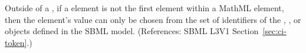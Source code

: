 Outside of a \FunctionDefinition, if a  element is not the first
element within a MathML  element, then the 
element's value can only be chosen from the set of identifiers of the
\Species, \Compartment,
\Parameter or \Reaction objects defined in the SBML model.  (References:
SBML L3V1 Section~\ref{sec:ci-token}.)
